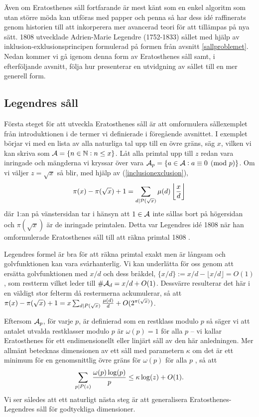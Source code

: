 
Även om Eratosthenes såll fortfarande är mest känt som en enkel algoritm som utan större möda kan utföras med papper och penna så har dess idé raffinerats genom historien till att inkorperera mer avancerad teori för att tillämpas på nya sätt. 1808 utvecklade Adrien-Marie Legendre (1752-1833) sållet med hjälp av inklusion-exklusionsprincipen formulerad på formen från avsnitt \ref{sallproblemet}. Nedan kommer vi gå igenom denna form av Eratosthenes såll samt, i efterföljande avsnitt, följa hur \cite{cojocarumurty} presenterar en utvidgning av sållet till en mer generell form. 

\subsection{Legendres såll}

Första steget för att utveckla Eratosthenes såll är att omformulera sållexemplet från introduktionen i de termer vi definierade i föregående avsnittet. I exemplet börjar vi med en lista av alla naturliga tal upp till en övre gräns, säg $x$, vilken vi kan skriva som $\mathcal{A} = \{n \in \mathbb{N} : n \leq x\}$. Låt alla primtal upp till $z$ redan vara inringade och mängderna vi kryssar över vara \(\mathcal{A}_p = \{a \in \mathcal{A} :  a \equiv 0 \pmod{p}\}\). Om vi väljer $z = \sqrt{x}$ så blir, med hjälp av (\ref{inclusionexclusion}),
\begin{align*}
    \pi(x) - \pi(\sqrt{x}) + 1 = \sum_{d \mid \mathcal{P}(\sqrt{x})} \mu(d) \left\lfloor \frac{x}{d} \right\rfloor  
\end{align*}
där \(1\):an på vänstersidan tar i hänsyn att \(1 \in \mathcal{A}\) inte sållas bort på högersidan och \(\pi(\sqrt{x})\) är de inringade primtalen. Detta var Legendres idé 1808 när han omformulerade Eratosthenes såll till att räkna primtal 1808 \cite{opera}. 

Legendres formel är bra för att räkna primtal exakt men är långsam och golvfunktionen kan vara svårhanterlig. Vi kan underlätta för oss genom att ersätta golvfunktionen med $x/d$ och dess bråkdel, \(\{x/d\} := x/d - \lfloor x/d \rfloor = O(1)\), som restterm vilket leder till \(\# \mathcal{A}_d = x/d + O(1)\). Dessvärre resulterar det här i en väldigt stor felterm då restermerna ackumulerar, så att \(\pi(x) - \pi(\sqrt{x}) + 1 = x \sum_{d \mid P(\sqrt{x})}\frac{\mu(d)}{d} + O(2^{\pi(\sqrt{x})}) \).

Eftersom \(\mathcal{A}_p\), för varje $p$, är definierad som en restklass modulo $p$ så säger vi att antalet utvalda restklasser modulo $p$ är $\omega(p) = 1$ för alla $p$ -- vi kallar Eratosthenes för ett endimensionellt eller linjärt såll av den här anledningen. Mer allmänt betecknas dimensionen av ett såll med parametern \(\kappa\) om det är ett minimum för en genomsnittlig övre gräns för \(\omega(p)\) för alla $p$ \cite{tenenbaum}, så att
\begin{align} \label{dimension}
    \sum_{p \mid P(z)} \frac{\omega(p) \log(p)}{p} \leq \kappa \log(z) + O(1).
\end{align}
Vi ser således att ett naturligt nästa steg är att generalisera Eratosthenes-Legendres såll för godtyckliga dimensioner. 

